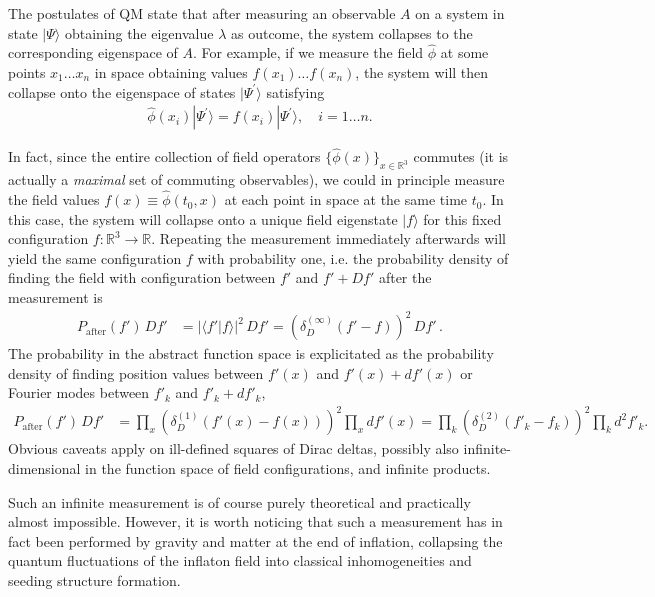 \documentclass[../QFT_main.tex]{subfiles}
\begin{document}
\begin{mytheorem}
%
The postulates of QM state that after measuring an observable $A$ on a system in state $|\Psi\rangle$ obtaining the eigenvalue $\lambda$ as outcome, the system collapses to the corresponding eigenspace of $A$.
For example, if we measure the field $\hat{\phi}$ at some points $x_1\dots x_n$ in space obtaining values $f(x_1)\dots f(x_n)$, the system will then collapse onto the eigenspace of states $|\Psi^\prime\rangle$ satisfying
\begin{align}
    \hat{\phi}(x_i) |\Psi^\prime\rangle = f(x_i) |\Psi^\prime\rangle, \quad i=1\dots n.
\end{align}

In fact, since the entire collection of field operators $\{\hat{\phi}(x)\}_{x\in \mathbb{R}^3}$ commutes (it is actually a \emph{maximal} set of commuting observables), we could in principle measure the field values $f(x)\equiv\hat{\phi}(t_0,x)$ at each point in space at the same time $t_0$.
In this case, the system will collapse onto a unique field eigenstate $|f\rangle$ for this fixed configuration $f:\mathbb{R}^3 \to \mathbb{R}$.
Repeating the measurement immediately afterwards will yield the same configuration $f$ with probability one, i.e. the probability density of finding the field with configuration between $f'$ and $f'+Df'$ after the measurement is
\begin{align}
    P_{\text{after}}(f') \,Df' &= |\langle f' | f \rangle|^2 \,Df' = \left(\delta_D^{(\infty)}(f' - f)\right)^2 \,Df'\,.
\end{align}
The probability in the abstract function space is explicitated as the probability density of finding position values between $f'(x)$ and $f'(x) + df'(x)$ or Fourier modes between $f'_k$ and $f'_k + d f'_k$,
\begin{align}
    P_{\text{after}}(f') \,Df' &= \prod_{x} \left(\delta_D^{(1)}(f'(x) - f(x))\right)^2 \prod_x df'(x)
    = \prod_{k} \left(\delta_D^{(2)}(f'_k - f_k)\right)^2 \prod_k d^2\!f'_k.
\end{align}
Obvious caveats apply on ill-defined squares of Dirac deltas, possibly also infinite-dimensional in the function space of field configurations, and infinite products.

Such an infinite measurement is of course purely theoretical and practically almost impossible.
However, it is worth noticing that such a measurement has in fact been performed by gravity and matter at the end of inflation, collapsing the quantum fluctuations of the inflaton field into classical inhomogeneities and seeding structure formation. 
\end{mytheorem}
\end{document}
